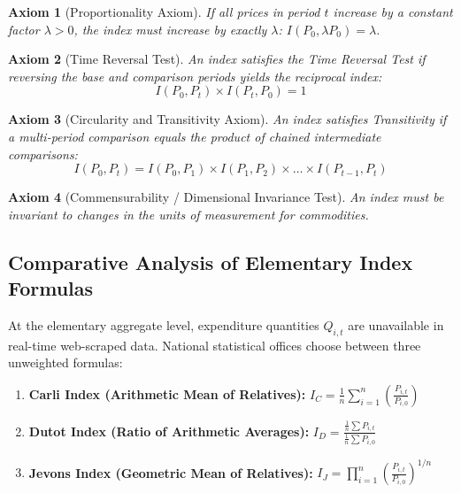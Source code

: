 \documentclass[11pt,a4paper,oneside]{article}
\newtheorem{axiom}{Axiom}
\begin{document}
\begin{axiom}[Proportionality Axiom]
If all prices in period $t$ increase by a constant factor $\lambda > 0$, the index must increase by exactly $\lambda$: $I(P_0, \lambda P_0) = \lambda$.
\end{axiom}

\begin{axiom}[Time Reversal Test]
An index satisfies the Time Reversal Test if reversing the base and comparison periods yields the reciprocal index:
\begin{equation}
I(P_0, P_t) \times I(P_t, P_0) = 1
\end{equation}
\end{axiom}

\begin{axiom}[Circularity and Transitivity Axiom]
An index satisfies Transitivity if a multi-period comparison equals the product of chained intermediate comparisons:
\begin{equation}
I(P_0, P_t) = I(P_0, P_1) \times I(P_1, P_2) \times \dots \times I(P_{t-1}, P_t)
\end{equation}
\end{axiom}

\begin{axiom}[Commensurability / Dimensional Invariance Test]
An index must be invariant to changes in the units of measurement for commodities.
\end{axiom}

\subsection{Comparative Analysis of Elementary Index Formulas}
At the elementary aggregate level, expenditure quantities $Q_{i,t}$ are unavailable in real-time web-scraped data. National statistical offices choose between three unweighted formulas:
\begin{enumerate}
    \item \textbf{Carli Index (Arithmetic Mean of Relatives):} $I_C = \frac{1}{n} \sum_{i=1}^n \left( \frac{P_{i,t}}{P_{i,0}} \right)$
    \item \textbf{Dutot Index (Ratio of Arithmetic Averages):} $I_D = \frac{\frac{1}{n} \sum P_{i,t}}{\frac{1}{n} \sum P_{i,0}}$
    \item \textbf{Jevons Index (Geometric Mean of Relatives):} $I_J = \prod_{i=1}^n \left( \frac{P_{i,t}}{P_{i,0}} \right)^{1/n}$
\end{enumerate}
\end{document}
